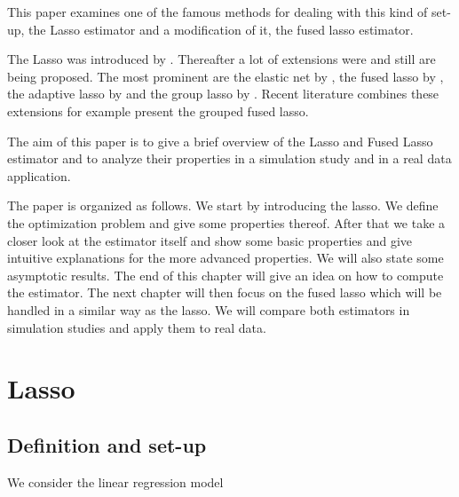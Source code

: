 \documentclass{article}
\theoremstyle{definition}
\begin{document}
This paper examines one of the famous methods for dealing with this kind of set-up, the Lasso estimator and a modification of it, the fused lasso estimator.

%



The Lasso was introduced by \citet{lasso}. Thereafter a lot of extensions were and still are being proposed. The most prominent are the elastic net by \citet{zou2005regularization}, the fused lasso by \citet{fused}, the adaptive lasso by \citet{zou2006adaptive} and  the group lasso by \citet{meier2008group}. Recent literature combines these extensions for example  \citet{bleakley2011group} present the grouped fused lasso.

The aim of this paper is to give a brief overview of the Lasso and Fused Lasso estimator and to analyze their properties in a simulation study and in a real data application. 

The paper is organized as follows. We start by introducing the lasso. We define the optimization problem and give some properties thereof. After that we take a closer look at the estimator itself and show some basic properties and give intuitive explanations for the more advanced properties. We will also state some asymptotic results. The end of this chapter will give an idea on how to compute the estimator. The next chapter will then focus on the fused lasso which will be handled in a similar way as the lasso. We will compare both estimators in simulation studies and apply them to real data.




\newpage

\section{Lasso}
\subsection{Definition and set-up}
We consider the linear regression model
\end{document}
